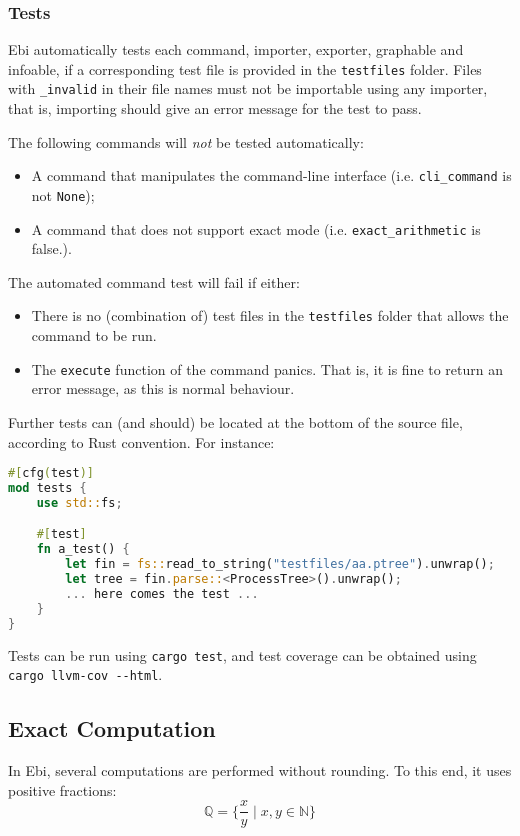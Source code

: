 \documentclass{article}
\begin{document}
        \subsubsection{Tests}
            Ebi automatically tests each command, importer, exporter, graphable and infoable, if a corresponding test file is provided in the \verb=testfiles= folder.
            Files with \verb=_invalid= in their file names must not be importable using any importer, that is, importing should give an error message for the test to pass.

            The following commands will \emph{not} be tested automatically:
            \begin{itemize}
                \item A command that manipulates the command-line interface (i.e. \verb=cli_command= is not \verb=None=);
                \item A command that does not support exact mode (i.e. \verb=exact_arithmetic= is false.).
            \end{itemize}
            The automated command test will fail if either:
            \begin{itemize}
                \item There is no (combination of) test files in the \verb=testfiles= folder that allows the command to be run.
                \item The \verb=execute= function of the command panics.
                That is, it is fine to return an error message, as this is normal behaviour.
            \end{itemize}

            Further tests can (and should) be located at the bottom of the source file, according to Rust convention.
            For instance:
\begin{lstlisting}[language=Rust, style=boxed]
#[cfg(test)]
mod tests {
    use std::fs;

    #[test]
    fn a_test() {
        let fin = fs::read_to_string("testfiles/aa.ptree").unwrap();
        let tree = fin.parse::<ProcessTree>().unwrap();
        ... here comes the test ...
    }
}
\end{lstlisting}

            Tests can be run using \verb=cargo test=, and test coverage can be obtained using \verb=cargo llvm-cov --html=.
		

    \subsection{Exact Computation}
    \label{sec:exact}
        In Ebi, several computations are performed without rounding.
        To this end, it uses positive fractions: 
        $$\mathbb{Q} = \{ \frac{x}{y} \mid x, y \in \mathbb{N} \}$$
    
\end{document}
